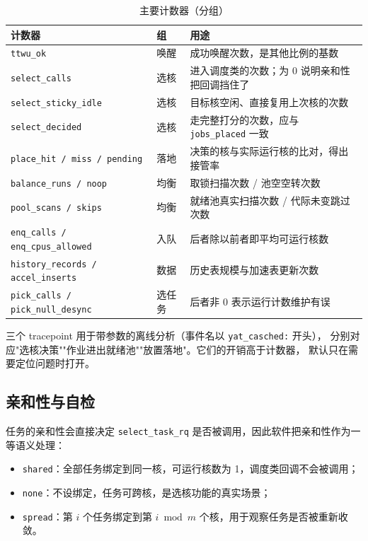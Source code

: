 \documentclass[11pt,a4paper]{article}
\newcommand{\code}[1]{\texttt{#1}}
\begin{document}
\begin{table}[H]
\centering
\caption{主要计数器（分组）}
\label{tab:counters}
\small
\begin{tabular}{@{}p{4.4cm}p{3.0cm}p{7.0cm}@{}}
\toprule
计数器 & 组 & 用途 \\
\midrule
\code{ttwu\_ok} & 唤醒 & 成功唤醒次数，是其他比例的基数 \\
\code{select\_calls} & 选核 & 进入调度类的次数；为 0 说明亲和性把回调挡住了 \\
\code{select\_sticky\_idle} & 选核 & 目标核空闲、直接复用上次核的次数 \\
\code{select\_decided} & 选核 & 走完整打分的次数，应与 \code{jobs\_placed} 一致 \\
\code{place\_hit / miss / pending} & 落地 & 决策的核与实际运行核的比对，得出接管率 \\
\code{balance\_runs / noop} & 均衡 & 取锁扫描次数 / 池空空转次数 \\
\code{pool\_scans / skips} & 均衡 & 就绪池真实扫描次数 / 代际未变跳过次数 \\
\code{enq\_calls / enq\_cpus\_allowed} & 入队 & 后者除以前者即平均可运行核数 \\
\code{history\_records / accel\_inserts} & 数据 & 历史表规模与加速表更新次数 \\
\code{pick\_calls / pick\_null\_desync} & 选任务 & 后者非 0 表示运行计数维护有误 \\
\bottomrule
\end{tabular}
\end{table}

三个 tracepoint 用于带参数的离线分析（事件名以 \code{yat\_casched:} 开头），
分别对应"选核决策""作业进出就绪池""放置落地"。它们的开销高于计数器，
默认只在需要定位问题时打开。

\subsection{亲和性与自检}

任务的亲和性会直接决定 \code{select\_task\_rq} 是否被调用，因此软件把亲和性作为一等语义处理：

\begin{itemize}
  \item \code{shared}：全部任务绑定到同一核，可运行核数为 1，调度类回调不会被调用；
  \item \code{none}：不设绑定，任务可跨核，是选核功能的真实场景；
  \item \code{spread}：第 $i$ 个任务绑定到第 $i \bmod m$ 个核，用于观察任务是否被重新收敛。
\end{itemize}
\end{document}
